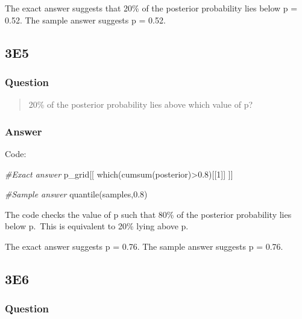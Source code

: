 \documentclass[
]{book}
\newenvironment{Shaded}{\begin{snugshade}}{\end{snugshade}}
\newcommand{\CommentTok}[1]{\textcolor[rgb]{0.56,0.35,0.01}{\textit{#1}}}
\newcommand{\DecValTok}[1]{\textcolor[rgb]{0.00,0.00,0.81}{#1}}
\newcommand{\FloatTok}[1]{\textcolor[rgb]{0.00,0.00,0.81}{#1}}
\newcommand{\FunctionTok}[1]{\textcolor[rgb]{0.00,0.00,0.00}{#1}}
\newcommand{\NormalTok}[1]{#1}
\newcommand{\SpecialCharTok}[1]{\textcolor[rgb]{0.00,0.00,0.00}{#1}}
\begin{document}
The exact answer suggests that 20\% of the posterior probability lies below p = 0.52. The sample answer suggests p = 0.52.

\hypertarget{e5}{%
\subsection*{3E5}\label{e5}}

\hypertarget{question-19}{%
\subsubsection*{Question}\label{question-19}}

\begin{quote}
20\% of the posterior probability lies above which value of p?
\end{quote}

\hypertarget{answer-19}{%
\subsubsection*{Answer}\label{answer-19}}

Code:

\begin{Shaded}
\begin{Highlighting}[]
\CommentTok{\#Exact answer}
\NormalTok{p\_grid[[}
  \FunctionTok{which}\NormalTok{(}\FunctionTok{cumsum}\NormalTok{(posterior)}\SpecialCharTok{\textgreater{}}\FloatTok{0.8}\NormalTok{)[[}\DecValTok{1}\NormalTok{]]}
\NormalTok{  ]]}

\CommentTok{\#Sample answer}
\FunctionTok{quantile}\NormalTok{(samples,}\FloatTok{0.8}\NormalTok{)}
\end{Highlighting}
\end{Shaded}

The code checks the value of p such that 80\% of the posterior probability lies below p.~This is equivalent to 20\% lying above p.

The exact answer suggests p = 0.76. The sample answer suggests p = 0.76.

\hypertarget{e6}{%
\subsection*{3E6}\label{e6}}

\hypertarget{question-20}{%
\subsubsection*{Question}\label{question-20}}
\end{document}
